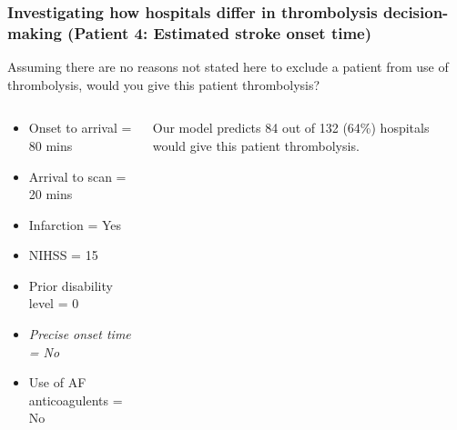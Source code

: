 \documentclass[xcolor={usenames,dvipsnames}]{beamer}
\begin{document}
\begin{frame}
\frametitle{Investigating how hospitals differ in thrombolysis decision-making (Patient 4: Estimated stroke onset time)}

Assuming there are no reasons not stated here to exclude a patient from use of thrombolysis, would you give this patient thrombolysis?

\vspace{3mm}

\begin{columns}
    \begin{column}{0.5\textwidth}
        \begin{itemize}
            \item Onset to arrival = 80 mins
            \item Arrival to scan = 20 mins
            \item Infarction = Yes
            \item NIHSS = 15
            \item Prior disability level = 0
            \item \emph{Precise onset time = No}
            \item Use of AF anticoagulents = No
        \end{itemize}
    \end{column}
    
    \begin{column}{0.4\textwidth}
    Our model predicts 84 out of 132 (64\%) hospitals would give this patient thrombolysis.
    \end{column}

\end{columns}
\end{frame}


\end{document}
